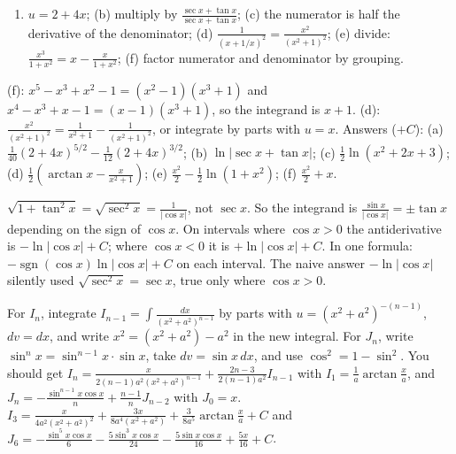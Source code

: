\documentclass[11pt,a4paper]{article}
\begin{document}
\begin{enumerate}
\def\labelenumi{(\alph{enumi})}
\tightlist
\item
  \(u=2+4x\); (b) multiply by \(\frac{\sec x+\tan x}{\sec x+\tan x}\); (c) the numerator is half the derivative of the denominator; (d) \(\frac1{(x+1/x)^2}=\frac{x^2}{(x^2+1)^2}\); (e) divide: \(\frac{x^3}{1+x^2}=x-\frac{x}{1+x^2}\); (f) factor numerator and denominator by grouping.
\end{enumerate}
(f): \(x^5-x^3+x^2-1=(x^2-1)(x^3+1)\) and \(x^4-x^3+x-1=(x-1)(x^3+1)\), so the integrand is \(x+1\). (d): \(\frac{x^2}{(x^2+1)^2}=\frac1{x^2+1}-\frac1{(x^2+1)^2}\), or integrate by parts with \(u=x\).
Answers (\(+C\)): (a) \(\frac1{40}(2+4x)^{5/2}-\frac1{12}(2+4x)^{3/2}\); (b) \(\ln\lvert\sec x+\tan x\rvert\); (c) \(\frac12\ln(x^2+2x+3)\); (d) \(\frac12\left(\arctan x-\frac{x}{x^2+1}\right)\); (e) \(\frac{x^2}2-\frac12\ln(1+x^2)\); (f) \(\frac{x^2}2+x\).

\(\sqrt{1+\tan^2x}=\sqrt{\sec^2x}=\frac1{\lvert\cos x\rvert}\), not \(\sec x\). So the integrand is \(\frac{\sin x}{\lvert\cos x\rvert}=\pm\tan x\) depending on the sign of \(\cos x\).
On intervals where \(\cos x\gt 0\) the antiderivative is \(-\ln\lvert\cos x\rvert+C\); where \(\cos x\lt 0\) it is \(+\ln\lvert\cos x\rvert+C\). In one formula: \(-\operatorname{sgn}(\cos x)\ln\lvert\cos x\rvert+C\) on each interval. The naive answer \(-\ln\lvert\cos x\rvert\) silently used \(\sqrt{\sec^2x}=\sec x\), true only where \(\cos x\gt 0\).

For \(I_n\), integrate \(I_{n-1}=\int\frac{dx}{(x^2+a^2)^{n-1}}\) by parts with \(u=(x^2+a^2)^{-(n-1)}\), \(dv=dx\), and write \(x^2=(x^2+a^2)-a^2\) in the new integral. For \(J_n\), write \(\sin^nx=\sin^{n-1}x\cdot\sin x\), take \(dv=\sin x\,dx\), and use \(\cos^2=1-\sin^2\).
You should get \(I_n=\frac{x}{2(n-1)a^2(x^2+a^2)^{n-1}}+\frac{2n-3}{2(n-1)a^2}I_{n-1}\) with \(I_1=\frac1a\arctan\frac xa\), and \(J_n=-\frac{\sin^{n-1}x\cos x}{n}+\frac{n-1}{n}J_{n-2}\) with \(J_0=x\).
\(I_3=\frac{x}{4a^2(x^2+a^2)^2}+\frac{3x}{8a^4(x^2+a^2)}+\frac{3}{8a^5}\arctan\frac xa+C\) and \(J_6=-\frac{\sin^5x\cos x}{6}-\frac{5\sin^3x\cos x}{24}-\frac{5\sin x\cos x}{16}+\frac{5x}{16}+C\).
\end{document}
